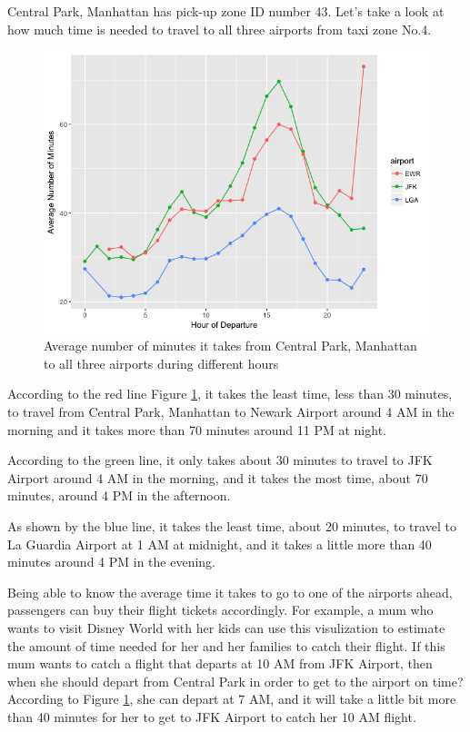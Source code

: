 \documentclass[12pt,twoside]{reedthesis}
\theoremstyle{definition}
\theoremstyle{definition}
\theoremstyle{definition}
\theoremstyle{remark}
\begin{document}
Central Park, Manhattan has pick-up zone ID number 43. Let's take a look
at how much time is needed to travel to all three airports from taxi
zone No.4.
\begin{figure}
\includegraphics[width=5.67in]{figure/airport_vis} \caption{Average number of minutes it takes from Central Park, Manhattan to all three airports during different hours}\label{fig:airport-vis}
\end{figure}
According to the red line Figure \ref{fig:airport-vis}, it takes the
least time, less than 30 minutes, to travel from Central Park, Manhattan
to Newark Airport around 4 AM in the morning and it takes more than 70
minutes around 11 PM at night.

According to the green line, it only takes about 30 minutes to travel to
JFK Airport around 4 AM in the morning, and it takes the most time,
about 70 minutes, around 4 PM in the afternoon.

As shown by the blue line, it takes the least time, about 20 minutes, to
travel to La Guardia Airport at 1 AM at midnight, and it takes a little
more than 40 minutes around 4 PM in the evening.

Being able to know the average time it takes to go to one of the
airports ahead, passengers can buy their flight tickets accordingly. For
example, a mum who wants to visit Disney World with her kids can use
this visulization to estimate the amount of time needed for her and her
families to catch their flight. If this mum wants to catch a flight that
departs at 10 AM from JFK Airport, then when she should depart from
Central Park in order to get to the airport on time? According to Figure
\ref{fig:airport-vis}, she can depart at 7 AM, and it will take a little
bit more than 40 minutes for her to get to JFK Airport to catch her 10
AM flight.
\end{document}
